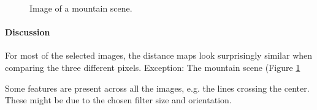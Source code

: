 \documentclass[11pt,a4paper]{article}
\begin{document}
\begin{figure}
\quad
{}
\caption{Image of a mountain scene.}
\label{fig:8}
\end{figure}


\paragraph{Discussion}
For most of the selected images, the distance maps look surprisingly similar when comparing the three different pixels.
Exception: The mountain scene (Figure \ref{fig:8}

Some features are present across all the images, e.g. the lines crossing the center. These might be due to the chosen filter size and orientation.
\end{document}
